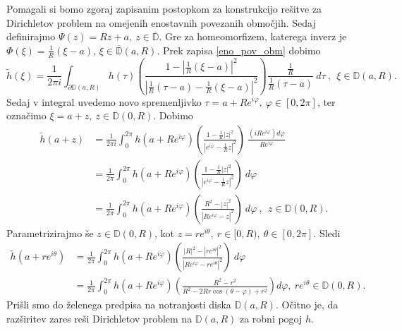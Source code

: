 \documentclass[mat1, tisk]{fmfdelo}
\begin{document}
     \begin{dokaz}
        Pomagali si bomo zgoraj zapisanim postopkom za konstrukcijo rešitve za \mbox{Dirichletov} problem na omejenih enostavnih povezanih območjih. 
        Sedaj definirajmo $\Psi(z) = Rz + a,~z \in \overline{\mathbb{D}}$. Gre za homeomorfizem, katerega inverz je \mbox{$\Phi(\xi) = \frac{1}{R}(\xi - a)$}, $\xi \in \overline{\mathbb{D}}(a,R)$.
        Prek zapisa \eqref{eno_pov_obm} dobimo
        $$ 
        \widetilde{h}(\xi) = \frac{1}{2\pi i}\int_{\partial \mathbb{D}(a,R)}{h(\tau) \left(\frac{1 - |\frac{1}{R}(\xi - a)|^2}{|\frac{1}{R}(\tau - a) - \frac{1}{R}(\xi - a)|^2}\right)\frac{\frac{1}{R}}{\frac{1}{R}(\tau - a)}~d \tau}~,~~\xi \in \mathbb{D}(a,R). 
        $$
        Sedaj v integral uvedemo novo spremenljivko $\tau = a + Re^{i \varphi},~\varphi \in [0,2\pi]$, ter označimo $\xi = a + z,~z \in \mathbb{D}(0, R)$. Dobimo
        \begin{align*}
            \widetilde{h}(a + z) &= \frac{1}{2\pi i}\int_{0}^{2 \pi}{h(a + R e^{i \varphi}) \left(\frac{1 - \frac{1}{R}|z|^2}{|e^{i \varphi} - \frac{1}{R} z|^2}\right)~\frac{(i R e^{i \varphi}) d \varphi}{R e^{i \varphi}}}\\
            & = \frac{1}{2 \pi}\int_{0}^{2 \pi}{h(a + R e^{i \varphi}) \left(\frac{1 - \frac{1}{R}|z|^2}{|e^{i \varphi} - \frac{1}{R} z|^2}\right)~d\varphi}\\
            & = \frac{1}{2 \pi}\int_{0}^{2 \pi}{h(a + R e^{i \varphi}) \left(\frac{R^2 - |z|^2}{|R e^{i \varphi} - z|^2}\right)~d\varphi}~,~~z \in \mathbb{D}(0,R).
        \end{align*}
        Parametrizirajmo še $z \in \mathbb{D}(0,R)$, kot $z = r e^{i \theta},~r \in [0,R),~\theta \in [0,2 \pi]$. Sledi
        \begin{align*}
            \widetilde{h}(a + r e^{i \theta}) &= \frac{1}{2 \pi}\int_{0}^{2 \pi}{h(a + R e^{i \varphi}) \left(\frac{|R|^2 - |r e^{i \theta}|^2}{|R e^{i \varphi} - r e^{i \theta}|^2}\right)~d\varphi} \\
            & = \frac{1}{2 \pi}\int_{0}^{2 \pi}{h(a + R e^{i \varphi}) \left(\frac{R^2 - r^2}{R^2 - 2Rr \cos(\theta - \varphi) + r^2}\right)d\varphi},~r e^{i \theta} \in \mathbb{D}(0,R).
        \end{align*}
        Prišli smo do želenega predpisa na notranjosti diska $\mathbb{D}(a,R)$. 
        Očitno je, da razširitev zares reši Dirichletov problem na $\mathbb{D}(a,R)$ za robni pogoj $h$.
     \end{dokaz}
\end{document}
